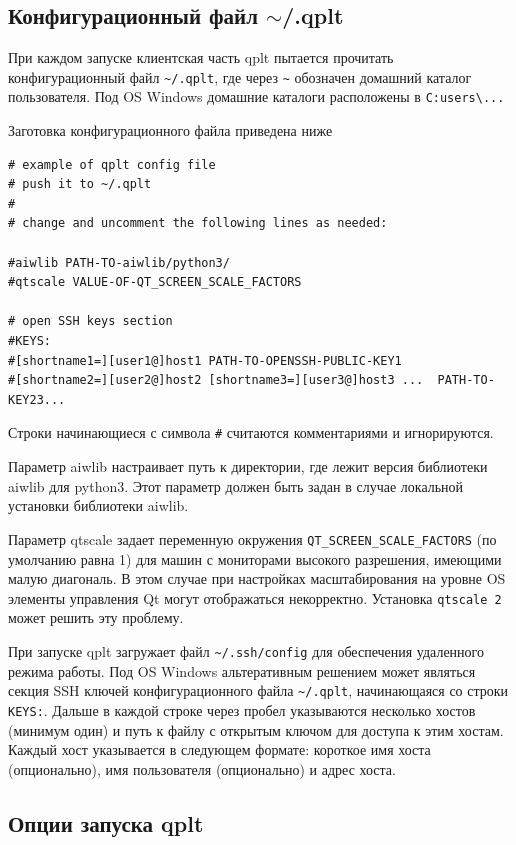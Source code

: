 \documentclass[12pt]{article}
\begin{document}
\subsection{Конфигурационный файл $\sim$/.qplt}
При каждом  запуске клиентская часть qplt пытается прочитать конфигурационный файл \verb'~/.qplt', где через \verb'~' обозначен домашний каталог пользователя.
Под OS Windows домашние каталоги расположены в \verb'C:users\...'

Заготовка конфигурационного файла приведена ниже
\begin{verbatim}
# example of qplt config file
# push it to ~/.qplt
#
# change and uncomment the following lines as needed:

#aiwlib PATH-TO-aiwlib/python3/
#qtscale VALUE-OF-QT_SCREEN_SCALE_FACTORS

# open SSH keys section
#KEYS:
#[shortname1=][user1@]host1 PATH-TO-OPENSSH-PUBLIC-KEY1
#[shortname2=][user2@]host2 [shortname3=][user3@]host3 ...  PATH-TO-KEY23...
\end{verbatim}

Строки начинающиеся с символа \verb'#' считаются комментариями и игнорируются. 

Параметр aiwlib настраивает путь к директории, где лежит версия библиотеки aiwlib для python3. Этот параметр должен быть задан в случае
локальной установки библиотеки aiwlib.

Параметр qtscale задает переменную окружения \verb'QT_SCREEN_SCALE_FACTORS' (по умолчанию равна 1) для
машин с мониторами высокого разрешения, имеющими малую диагональ. В этом случае при настройках масштабирования на уровне OS элементы управления Qt могут отображаться некорректно. Установка \verb'qtscale 2' может решить эту проблему. 

При запуске qplt загружает файл \verb'~/.ssh/config' для обеспечения удаленного режима работы.
Под OS Windows альтеративным решением может являться секция SSH ключей конфигурационного файла \verb'~/.qplt',
начинающаяся со строки \verb'KEYS:'.
Дальше в каждой строке через пробел указываются несколько хостов (минимум один) и путь к файлу с открытым ключом для доступа к этим хостам.
Каждый хост указывается в следующем формате: короткое имя хоста (опционально), имя пользователя (опционально) и адрес хоста.

\subsection{Опции запуска qplt}
\end{document}
